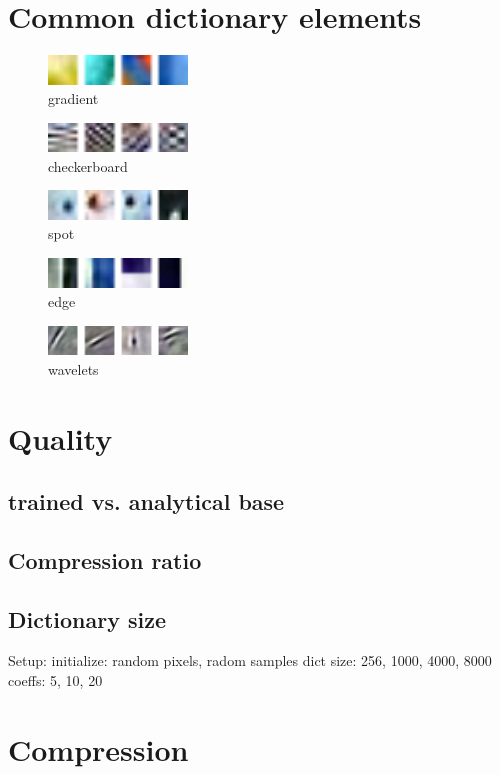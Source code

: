 \section{Common dictionary elements}

\begin{figure}
\centering
\includegraphics[width = 0.33\textwidth]{images/gradient.png} 
\caption{gradient}
\label{fig:gradient}
\end{figure}

\begin{figure}
\centering
\includegraphics[width = 0.33\textwidth]{images/checkerboard.png}
\caption{checkerboard}
\label{fig:checkerboard}
\end{figure}


\begin{figure}
\centering
\includegraphics[width = 0.33\textwidth]{images/spot.png} 
\caption{spot}
\label{fig:spot}
\end{figure}


\begin{figure}
\centering
\includegraphics[width = 0.33\textwidth]{images/edges.png}
\caption{edge}
\label{fig:edge}
\end{figure}

\begin{figure}
\centering
\includegraphics[width = 0.33\textwidth]{images/wavelet.png}
\caption{wavelets}
\label{fig:wavelets}
\end{figure}


\section{Quality}
\subsection*{trained vs. analytical base}
\subsection*{Compression ratio}
\subsection*{Dictionary size}
Setup:
  initialize: random pixels, radom samples 
  dict size: 256, 1000, 4000, 8000
  coeffs: 5, 10, 20

\section{Compression}







